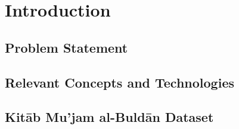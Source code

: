 

\chapter{Introduction}\label{ch:introduction}

\section{Problem Statement}\label{sec:problem-statement}


\section{Relevant Concepts and Technologies}\label{sec:relevant-concepts}


\section{Kitāb Mu'jam al-Buldān Dataset}\label{sec:yagut}




